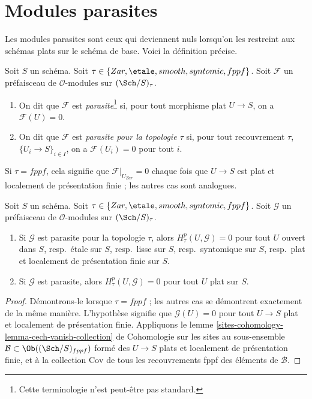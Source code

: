




\section{Modules parasites}
\label{section-parasitic}

\noindent
Les modules parasites sont ceux qui deviennent nuls lorsqu'on les restreint
aux schémas plats sur le schéma de base. Voici la définition précise.

\begin{definition}
\label{definition-parasitic}
Soit $S$ un schéma. Soit $\tau \in \{Zar, \etale,
smooth, syntomic, fppf\}$. Soit $\mathcal{F}$ un préfaisceau de
$\mathcal{O}$-modules sur $(\Sch/S)_\tau$.
\begin{enumerate}
\item On dit que $\mathcal{F}$ est
{\it parasite}\footnote{Cette terminologie n'est peut-être pas standard.}
si, pour tout morphisme plat $U \to S$, on a $\mathcal{F}(U) = 0$.
\item On dit que $\mathcal{F}$ est {\it parasite pour la topologie $\tau$}
si, pour tout recouvrement $\tau$,
$\{U_i \to S\}_{i \in I}$, on a $\mathcal{F}(U_i) = 0$ pour tout $i$.
\end{enumerate}
\end{definition}

\noindent
Si $\tau = fppf$, cela signifie que $\mathcal{F}|_{U_{Zar}} = 0$ chaque fois
que $U \to S$ est plat et localement de présentation finie ; les autres cas
sont analogues.

\begin{lemma}
\label{lemma-cohomology-parasitic}
Soit $S$ un schéma. Soit $\tau \in \{Zar, \etale, smooth,
syntomic, fppf\}$. Soit $\mathcal{G}$ un préfaisceau de
$\mathcal{O}$-modules sur $(\Sch/S)_\tau$.
\begin{enumerate}
\item Si $\mathcal{G}$ est parasite pour la topologie $\tau$, alors
$H^p_\tau(U, \mathcal{G}) = 0$ pour tout $U$ ouvert dans $S$,
resp.\ \'etale sur $S$,
resp.\ lisse sur $S$,
resp.\ syntomique sur $S$,
resp.\ plat et localement de présentation finie sur $S$.
\item Si $\mathcal{G}$ est parasite, alors
$H^p_\tau(U, \mathcal{G}) = 0$ pour tout $U$ plat sur $S$.
\end{enumerate}
\end{lemma}

\begin{proof}
Démontrons-le lorsque $\tau = fppf$ ; les autres cas se démontrent exactement
de la même manière. L'hypothèse signifie que $\mathcal{G}(U) = 0$ pour tout
$U \to S$ plat et localement de présentation finie. Appliquons le lemme
\ref{sites-cohomology-lemma-cech-vanish-collection} de Cohomologie sur les
sites au sous-ensemble
$\mathcal{B} \subset \Ob((\Sch/S)_{fppf})$ formé des $U \to S$ plats et
localement de présentation finie, et à la collection $\text{Cov}$ de tous les
recouvrements fppf des éléments de $\mathcal{B}$.
\end{proof}

